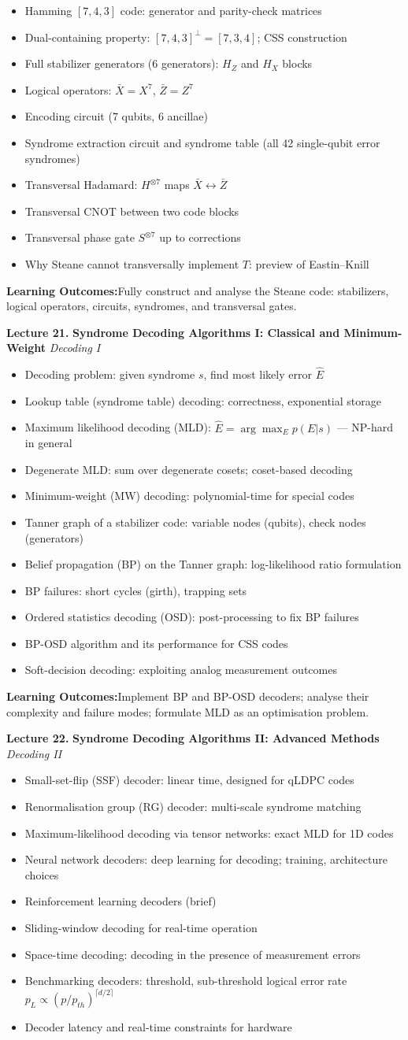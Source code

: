\documentclass[12pt,oneside]{article}
\newcommand{\lecturetitle}[3]{%
  \vspace{10pt}
  \begin{tcolorbox}[
    enhanced,breakable,
    colback=highlight,colframe=accent,
    arc=2pt,left=10pt,right=8pt,top=7pt,bottom=7pt,boxrule=0.7pt
  ]
    \textbf{\color{accent}Lecture #1.\enspace}%
    {\color{primary}\bfseries #2}%
    \hfill{\small\color{warmgold}\textit{#3}}
  \end{tcolorbox}
  \vspace{-2pt}
}
\newcommand{\topics}[1]{%
  \begin{itemize}[leftmargin=1.5em,itemsep=1.5pt,topsep=3pt,parsep=0pt]
    #1
  \end{itemize}\vspace{2pt}
}
\newcommand{\T}[1]{\item #1}
\newcommand{\keybox}[1]{%
  \begin{tcolorbox}[
    enhanced,colback=lightgray,colframe=rulegray,
    arc=2pt,left=8pt,right=8pt,top=5pt,bottom=5pt,boxrule=0.4pt,
    fontupper=\small
  ]
    \textbf{\color{primary}Learning Outcomes:\enspace}#1
  \end{tcolorbox}\vspace{4pt}
}
\begin{document}
\topics{
  \T{Hamming $[7,4,3]$ code: generator and parity-check matrices}
  \T{Dual-containing property: $[7,4,3]^\perp=[7,3,4]$; CSS construction}
  \T{Full stabilizer generators (6 generators): $H_Z$ and $H_X$ blocks}
  \T{Logical operators: $\bar{X}=X^7$, $\bar{Z}=Z^7$}
  \T{Encoding circuit (7 qubits, 6 ancillae)}
  \T{Syndrome extraction circuit and syndrome table (all 42 single-qubit error syndromes)}
  \T{Transversal Hadamard: $H^{\otimes 7}$ maps $\bar{X}\leftrightarrow\bar{Z}$}
  \T{Transversal CNOT between two code blocks}
  \T{Transversal phase gate $S^{\otimes 7}$ up to corrections}
  \T{Why Steane cannot transversally implement $T$: preview of Eastin--Knill}
}

\keybox{Fully construct and analyse the Steane code: stabilizers, logical operators, circuits, syndromes, and transversal gates.}

\lecturetitle{21}{Syndrome Decoding Algorithms I: Classical and Minimum-Weight}{Decoding I}

\topics{
  \T{Decoding problem: given syndrome $s$, find most likely error $\hat{E}$}
  \T{Lookup table (syndrome table) decoding: correctness, exponential storage}
  \T{Maximum likelihood decoding (MLD): $\hat{E}=\arg\max_E p(E|s)$ --- NP-hard in general}
  \T{Degenerate MLD: sum over degenerate cosets; coset-based decoding}
  \T{Minimum-weight (MW) decoding: polynomial-time for special codes}
  \T{Tanner graph of a stabilizer code: variable nodes (qubits), check nodes (generators)}
  \T{Belief propagation (BP) on the Tanner graph: log-likelihood ratio formulation}
  \T{BP failures: short cycles (girth), trapping sets}
  \T{Ordered statistics decoding (OSD): post-processing to fix BP failures}
  \T{BP-OSD algorithm and its performance for CSS codes}
  \T{Soft-decision decoding: exploiting analog measurement outcomes}
}

\keybox{Implement BP and BP-OSD decoders; analyse their complexity and failure modes; formulate MLD as an optimisation problem.}

\lecturetitle{22}{Syndrome Decoding Algorithms II: Advanced Methods}{Decoding II}

\topics{
  \T{Small-set-flip (SSF) decoder: linear time, designed for qLDPC codes}
  \T{Renormalisation group (RG) decoder: multi-scale syndrome matching}
  \T{Maximum-likelihood decoding via tensor networks: exact MLD for 1D codes}
  \T{Neural network decoders: deep learning for decoding; training, architecture choices}
  \T{Reinforcement learning decoders (brief)}
  \T{Sliding-window decoding for real-time operation}
  \T{Space-time decoding: decoding in the presence of measurement errors}
  \T{Benchmarking decoders: threshold, sub-threshold logical error rate $p_L \propto (p/p_{th})^{\lceil d/2\rceil}$}
  \T{Decoder latency and real-time constraints for hardware}
}
\end{document}
